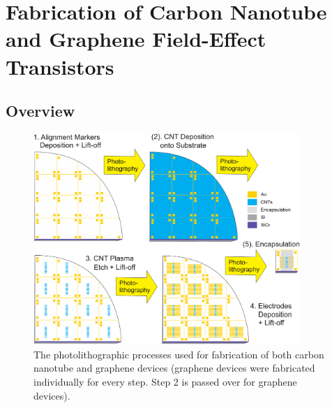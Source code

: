\documentclass[
  a4paper,
]{scrbook}
\begin{document}
\hypertarget{sec-qw-processing}{%
\section{Fabrication of Carbon Nanotube and Graphene Field-Effect
Transistors}\label{sec-qw-processing}}

\hypertarget{overview}{%
\subsection{Overview}\label{overview}}

\begin{figure}

{\centering \includegraphics[width=0.9\textwidth,height=\textheight]{figures/ch4/photolithography-cycle.png}

}

\caption{\label{fig-qw-photolithography}The photolithographic processes
used for fabrication of both carbon nanotube and graphene devices
(graphene devices were fabricated individually for every step. Step 2 is
passed over for graphene devices).}

\end{figure}
\end{document}
